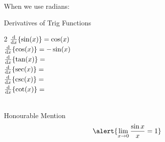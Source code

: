 %
%
%
\begin{frame}[t]\label{trigderivs}
When we use radians:
\begin{block}{Derivatives of Trig Functions}
\begin{multicols}{2}
\indent\alert{$\frac{\text{d}}{\text{d}x}\{\sin(x)\}=\cos(x)$\\
$\frac{\text{d}}{\text{d}x}\{\cos(x)\}=-\sin(x)$}\\
$\frac{\text{d}}{\text{d}x}\{\tan(x)\}=$\\

$\frac{\text{d}}{\text{d}x}\{\sec(x)\}=$\\
$\frac{\text{d}}{\text{d}x}\{\csc(x)\}=$\\
$\frac{\text{d}}{\text{d}x}\{\cot(x)\}=$\\~
\end{multicols}
\end{block}

\begin{block}{Honourable Mention}
\[\alert{\lim_{x \rightarrow 0 }\frac{\sin x}{x} = 1}\]
\end{block}

\end{frame}
